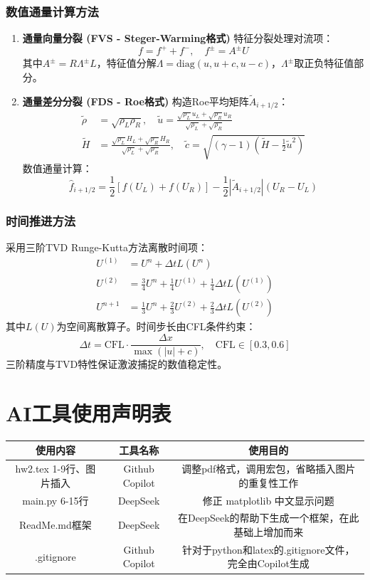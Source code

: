 \documentclass[UTF8]{ctexart}
\begin{document}
\subsubsection{数值通量计算方法}
\begin{enumerate}
    \item \textbf{通量向量分裂 (FVS - Steger-Warming格式)}  
    特征分裂处理对流项：
    $$f = f^+ + f^-,\quad f^\pm = A^\pm U$$
    其中$A^\pm = R\Lambda^\pm L$，特征值分解$\Lambda = \text{diag}(u,u+c,u-c)$，$\Lambda^\pm$取正负特征值部分。
    
    \item \textbf{通量差分分裂 (FDS - Roe格式)}  
    构造Roe平均矩阵$\tilde{A}_{i+1/2}$：
    \begin{align*}
    \tilde{\rho} &= \sqrt{\rho_L\rho_R},\quad \tilde{u} = \frac{\sqrt{\rho_L}u_L + \sqrt{\rho_R}u_R}{\sqrt{\rho_L} + \sqrt{\rho_R}} \\
    \tilde{H} &= \frac{\sqrt{\rho_L}H_L + \sqrt{\rho_R}H_R}{\sqrt{\rho_L} + \sqrt{\rho_R}},\quad \tilde{c} = \sqrt{(\gamma-1)\left(\tilde{H} - \frac{1}{2}\tilde{u}^2\right)}
    \end{align*}
    数值通量计算：
    $$\hat{f}_{i+1/2} = \frac{1}{2}\left[f(U_L)+f(U_R)\right] - \frac{1}{2}|\tilde{A}_{i+1/2}|(U_R - U_L)$$
\end{enumerate}

\subsubsection{时间推进方法}
采用三阶TVD Runge-Kutta方法离散时间项：
\begin{align*}
U^{(1)} &= U^n + \Delta t L(U^n) \\
U^{(2)} &= \frac{3}{4}U^n + \frac{1}{4}U^{(1)} + \frac{1}{4}\Delta t L(U^{(1)}) \\
U^{n+1} &= \frac{1}{3}U^n + \frac{2}{3}U^{(2)} + \frac{2}{3}\Delta t L(U^{(2)})
\end{align*}
其中$L(U)$为空间离散算子。时间步长由CFL条件约束：
$$\Delta t = \text{CFL}\cdot\frac{\Delta x}{\max(|u| + c)},\quad \text{CFL} \in [0.3, 0.6]$$
三阶精度与TVD特性保证激波捕捉的数值稳定性。



\newpage
\appendix
\section*{AI工具使用声明表}
\begin{table}[H]
    \centering
    \begin{tabular}{c|c|c}
        \hline
        使用内容 & 工具名称 & 使用目的 \\ \hline
        hw2.tex 1-9行、图片插入 & Github Copilot & 调整pdf格式，调用宏包，省略插入图片的重复性工作 \\ 
        main.py 6-15行 & DeepSeek & 修正 matplotlib 中文显示问题 \\ 
        ReadMe.md框架 & DeepSeek & 在DeepSeek的帮助下生成一个框架，在此基础上增加而来 \\
        .gitignore & Github Copilot & 针对于python和latex的.gitignore文件，完全由Copilot生成  
    \end{tabular}
    \label{tab:AI_tools}
\end{table}


\newpage
\section*{}
\end{document}
